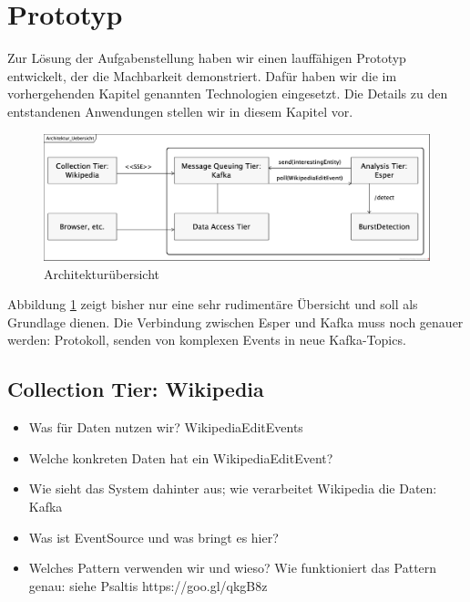 \section{Prototyp}
Zur Lösung der Aufgabenstellung haben wir einen lauffähigen Prototyp entwickelt, der die Machbarkeit demonstriert.
Dafür haben wir die im vorhergehenden Kapitel genannten Technologien eingesetzt. Die Details zu den entstandenen
Anwendungen stellen wir in diesem Kapitel vor.

\begin{figure}
    \includegraphics[width=\textwidth]{images/Architektur_Uebersicht.png}
    \caption{Architekturübersicht}
    \label{fig:architektur_uebersicht}
\end{figure}

Abbildung \ref{fig:architektur_uebersicht} zeigt bisher nur eine sehr rudimentäre Übersicht und soll als Grundlage dienen.
Die Verbindung zwischen Esper und Kafka muss noch genauer werden: Protokoll, senden von komplexen Events in neue Kafka-Topics.

\subsection{Collection Tier: Wikipedia}
\begin{itemize}
    \item Was für Daten nutzen wir? WikipediaEditEvents
    \item Welche konkreten Daten hat ein WikipediaEditEvent?
    \item Wie sieht das System dahinter aus; wie verarbeitet Wikipedia die Daten: Kafka
    \item Was ist EventSource und was bringt es hier?
        \item   Welches Pattern verwenden wir und wieso? Wie funktioniert das Pattern genau: siehe Psaltis https://goo.gl/qkgB8z
\end{itemize}

